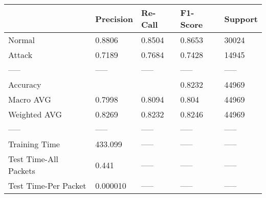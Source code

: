 \begin{tabular}{lllll}
\toprule
{} & Precision & Re-Call & F1-Score & Support \\
\midrule
Normal                &    0.8806 &  0.8504 &   0.8653 &   30024 \\
Attack                &    0.7189 &  0.7684 &   0.7428 &   14945 \\
-----                 &     ----- &   ----- &    ----- &   ----- \\
Accuracy              &           &         &   0.8232 &   44969 \\
Macro AVG             &    0.7998 &  0.8094 &    0.804 &   44969 \\
Weighted AVG          &    0.8269 &  0.8232 &   0.8246 &   44969 \\
-----                 &     ----- &   ----- &    ----- &   ----- \\
Training Time         &   433.099 &   ----- &    ----- &   ----- \\
Test Time-All Packets &     0.441 &   ----- &    ----- &   ----- \\
Test Time-Per Packet  &  0.000010 &   ----- &    ----- &   ----- \\
\bottomrule
\end{tabular}
